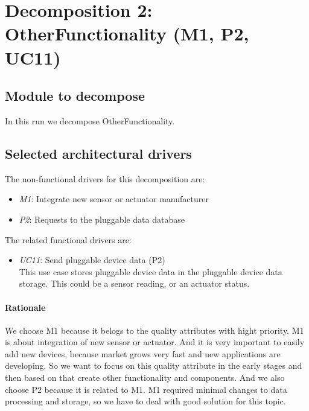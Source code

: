 \section{Decomposition 2: OtherFunctionality (M1, P2, UC11)}

\subsection{Module to decompose}
    In this run we decompose OtherFunctionality.


\subsection{Selected architectural drivers}
    The non-functional drivers for this decomposition are:
    \begin{itemize}
    	\item \emph{M1}: Integrate new sensor or actuator manufacturer
        \item \emph{P2}: Requests to the pluggable data database
    \end{itemize}

    \noindent The related functional drivers are:
    \begin{itemize}
        \item \emph{UC11}: Send pluggable device data (P2) \\
              This use case stores pluggable device data in the pluggable device data storage.
              This could be a sensor reading, or an actuator status.
    \end{itemize}

    \paragraph{Rationale}
    We choose M1 because it belogs to the quality attributes with hight priority. M1 is about
    integration of new sensor or actuator. And it is very important to easily add new devices, because market grows very fast
    and new applications are developing. So we want to focus on this quality attribute
    in the early stages and then based on that create other functionality and components.
    And we also choose P2 because it is related to M1. M1 required minimal changes to data processing and storage,
    so we have to deal with good solution for this topic.  
        



